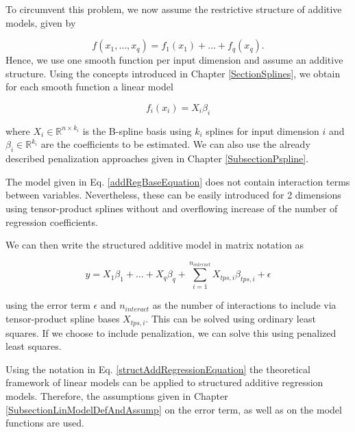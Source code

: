 \documentclass[10pt,a4paper]{article}
\begin{document}
To circumvent this problem, we now assume the restrictive structure of additive models, given by

\begin{equation} \label{addRegBaseEquation}
	f(x_1, \dots, x_q) = f_1(x_1) + \dots + f_q(x_q). 
\end{equation}
Hence, we use one smooth function per input dimension and assume an additive structure. Using the concepts introduced in Chapter \ref{SectionSplines}, we obtain for each smooth function a linear model

$$f_i(x_i) = X_i \beta_i$$

where $X_i \in \mathbb R^{n \times k_i}$ is the B-spline basis using $k_i$ splines for input dimension $i$ and $\beta_i \in \mathbb R^{k_i}$ are the coefficients to be estimated. We can also use the already described penalization approaches given in Chapter \ref{SubsectionPspline}. 

The model given in Eq. \ref{addRegBaseEquation} does not contain interaction terms between variables. Nevertheless, these can be easily introduced for 2 dimensions using tensor-product splines without and overflowing increase of the number of regression coefficients.

We can then write the structured additive model in matrix notation as 

\begin{equation} \label{structAddRegressionEquation}
	y = X_1\beta_1 + \dots + X_q\beta_q + \sum_{i=1}^{n_{interact}} X_{tps, i} \beta_{tps,i} + \epsilon
\end{equation}

using the error term $\epsilon$ and $n_{interact}$ as the number of interactions to include via tensor-product spline bases $X_{tps,i}$. This can be solved using ordinary least squares. If we choose to include penalization, we can solve this using penalized least squares. 

Using the notation in Eq. \ref{structAddRegressionEquation} the theoretical framework of linear models can be applied to structured additive regression models. Therefore, the assumptions given in Chapter \ref{SubsectionLinModelDefAndAssump} on the error term, as well as on the model functions are used.


\printbibliography
	
\end{document}
